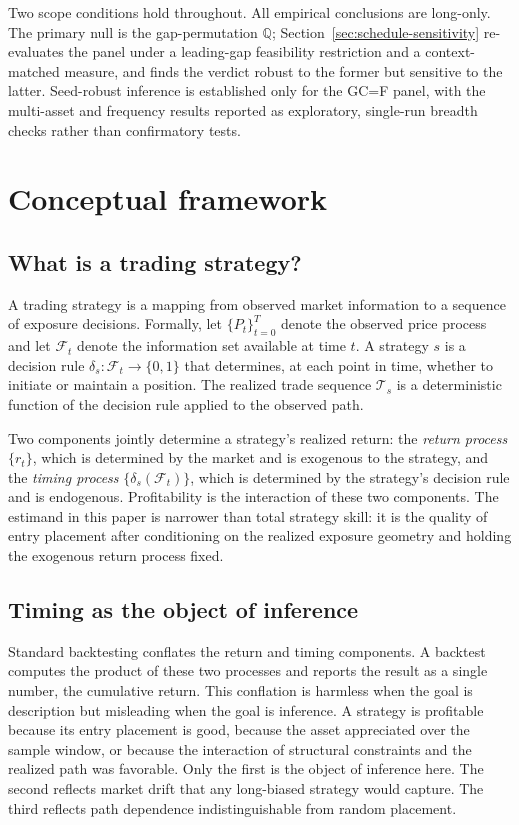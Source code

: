 \documentclass[preprint,12pt]{elsarticle}
\theoremstyle{definition}
\begin{document}
Two scope conditions hold throughout. All empirical conclusions are long-only. The primary null is the gap-permutation $\mathbb{Q}$; Section~\ref{sec:schedule-sensitivity} re-evaluates the panel under a leading-gap feasibility restriction and a context-matched measure, and finds the verdict robust to the former but sensitive to the latter. Seed-robust inference is established only for the GC=F panel, with the multi-asset and frequency results reported as exploratory, single-run breadth checks rather than confirmatory tests.

\section{Conceptual framework}

\subsection{What is a trading strategy?}

A trading strategy is a mapping from observed market information to a sequence of exposure decisions. Formally, let $\{P_t\}_{t=0}^{T}$ denote the observed price process and let $\mathcal{F}_t$ denote the information set available at time $t$. A strategy $s$ is a decision rule $\delta_s: \mathcal{F}_t \to \{0,1\}$ that determines, at each point in time, whether to initiate or maintain a position. The realized trade sequence $\mathcal{T}_s$ is a deterministic function of the decision rule applied to the observed path.

Two components jointly determine a strategy's realized return: the \emph{return process} $\{r_t\}$, which is determined by the market and is exogenous to the strategy, and the \emph{timing process} $\{\delta_s(\mathcal{F}_t)\}$, which is determined by the strategy's decision rule and is endogenous. Profitability is the interaction of these two components. The estimand in this paper is narrower than total strategy skill: it is the quality of entry placement after conditioning on the realized exposure geometry and holding the exogenous return process fixed.

\subsection{Timing as the object of inference}

Standard backtesting conflates the return and timing components. A backtest computes the product of these two processes and reports the result as a single number, the cumulative return. This conflation is harmless when the goal is description but misleading when the goal is inference. A strategy is profitable because its entry placement is good, because the asset appreciated over the sample window, or because the interaction of structural constraints and the realized path was favorable. Only the first is the object of inference here. The second reflects market drift that any long-biased strategy would capture. The third reflects path dependence indistinguishable from random placement.
\end{document}
